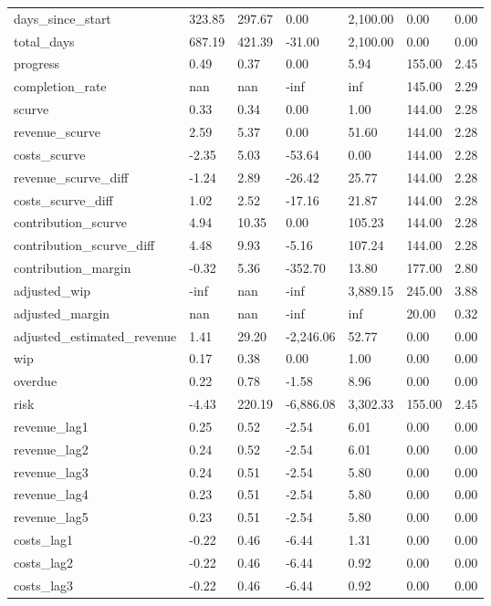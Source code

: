 \begin{landscape}
\begin{longtable}[h!]{lllllll}
days_since_start & 323.85 & 297.67 & 0.00 & 2,100.00 & 0.00 & 0.00 \\
total_days & 687.19 & 421.39 & -31.00 & 2,100.00 & 0.00 & 0.00 \\
progress & 0.49 & 0.37 & 0.00 & 5.94 & 155.00 & 2.45 \\
completion_rate & nan & nan & -inf & inf & 145.00 & 2.29 \\
scurve & 0.33 & 0.34 & 0.00 & 1.00 & 144.00 & 2.28 \\
revenue_scurve & 2.59 & 5.37 & 0.00 & 51.60 & 144.00 & 2.28 \\
costs_scurve & -2.35 & 5.03 & -53.64 & 0.00 & 144.00 & 2.28 \\
revenue_scurve_diff & -1.24 & 2.89 & -26.42 & 25.77 & 144.00 & 2.28 \\
costs_scurve_diff & 1.02 & 2.52 & -17.16 & 21.87 & 144.00 & 2.28 \\
contribution_scurve & 4.94 & 10.35 & 0.00 & 105.23 & 144.00 & 2.28 \\
contribution_scurve_diff & 4.48 & 9.93 & -5.16 & 107.24 & 144.00 & 2.28 \\
contribution_margin & -0.32 & 5.36 & -352.70 & 13.80 & 177.00 & 2.80 \\
adjusted_wip & -inf & nan & -inf & 3,889.15 & 245.00 & 3.88 \\
adjusted_margin & nan & nan & -inf & inf & 20.00 & 0.32 \\
adjusted_estimated_revenue & 1.41 & 29.20 & -2,246.06 & 52.77 & 0.00 & 0.00 \\
wip & 0.17 & 0.38 & 0.00 & 1.00 & 0.00 & 0.00 \\
overdue & 0.22 & 0.78 & -1.58 & 8.96 & 0.00 & 0.00 \\
risk & -4.43 & 220.19 & -6,886.08 & 3,302.33 & 155.00 & 2.45 \\
revenue_lag1 & 0.25 & 0.52 & -2.54 & 6.01 & 0.00 & 0.00 \\
revenue_lag2 & 0.24 & 0.52 & -2.54 & 6.01 & 0.00 & 0.00 \\
revenue_lag3 & 0.24 & 0.51 & -2.54 & 5.80 & 0.00 & 0.00 \\
revenue_lag4 & 0.23 & 0.51 & -2.54 & 5.80 & 0.00 & 0.00 \\
revenue_lag5 & 0.23 & 0.51 & -2.54 & 5.80 & 0.00 & 0.00 \\
costs_lag1 & -0.22 & 0.46 & -6.44 & 1.31 & 0.00 & 0.00 \\
costs_lag2 & -0.22 & 0.46 & -6.44 & 0.92 & 0.00 & 0.00 \\
costs_lag3 & -0.22 & 0.46 & -6.44 & 0.92 & 0.00 & 0.00 \\

\end{longtable}
\end{landscape}
